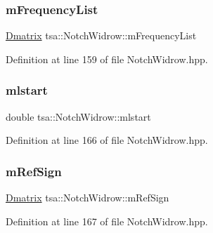 \subsubsection{\texorpdfstring{m\+Frequency\+List}{mFrequencyList}}
{\footnotesize\ttfamily \hyperlink{namespacetsa_ad260cd21c1891c4ed391fe788569aba4}{Dmatrix} tsa\+::\+Notch\+Widrow\+::m\+Frequency\+List\hspace{0.3cm}{\ttfamily [private]}}



Definition at line 159 of file Notch\+Widrow.\+hpp.

\mbox{\label{classtsa_1_1_notch_widrow_a16272fe55b1ddf22dcc04e7db1e92397}} 
\subsubsection{\texorpdfstring{mlstart}{mlstart}}
{\footnotesize\ttfamily double tsa\+::\+Notch\+Widrow\+::mlstart\hspace{0.3cm}{\ttfamily [private]}}



Definition at line 166 of file Notch\+Widrow.\+hpp.

\mbox{\label{classtsa_1_1_notch_widrow_a11653cedb6210434d45a8f30e1dc37b8}} 
\subsubsection{\texorpdfstring{m\+Ref\+Sign}{mRefSign}}
{\footnotesize\ttfamily \hyperlink{namespacetsa_ad260cd21c1891c4ed391fe788569aba4}{Dmatrix} tsa\+::\+Notch\+Widrow\+::m\+Ref\+Sign\hspace{0.3cm}{\ttfamily [private]}}



Definition at line 167 of file Notch\+Widrow.\+hpp.

\mbox{\label{classtsa_1_1_notch_widrow_a7b4784ec034908142ed52fa9fe33363c}} 
